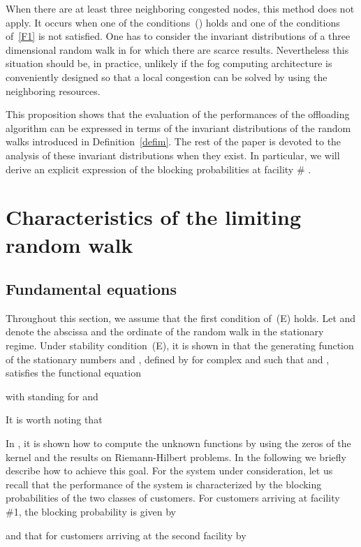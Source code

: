 \documentclass{amsart}
\begin{document}
{When there are at least three neighboring congested nodes, this method does not apply. It occurs when one of the conditions~() holds and one of the conditions of~\eqref{F1} is not satisfied. One has to consider the invariant distributions of a three dimensional random walk in  for which there are scarce results. Nevertheless this situation should be, in practice, unlikely if the fog computing architecture is conveniently designed so that a local congestion can be solved by using the neighboring resources.

This proposition shows that the evaluation of the performances of the offloading algorithm can be expressed in terms of the invariant distributions of the random walks  introduced in Definition~\ref{defim}. The rest of the paper is devoted to the analysis of these invariant distributions when they exist. In particular, we will derive an explicit expression of  the blocking probabilities  at facility \# .}

\section{Characteristics of the limiting random walk}\label{LimitRW}

\subsection{Fundamental equations}
Throughout this section, we assume that the first condition of~(E) holds. Let  and  denote the abscissa and the ordinate of the random walk  in the stationary regime. Under stability condition~(E), it is shown in \cite{FayolleIas} that the generating function of the stationary numbers  and , defined by  for complex  and  such that  and , satisfies the functional equation

with  standing for  and

It is worth noting that 


In \cite{FayolleIas,FIM}, it is shown how to compute the unknown functions by using the zeros of the kernel  and the results on Riemann-Hilbert problems. In the following we briefly describe how to achieve this goal. For the system under consideration, let us recall that the performance of the system is characterized by the blocking probabilities of the two classes of customers. For customers arriving at facility \#1, the blocking probability is given by

and that for customers arriving at the second facility by
\end{document}
